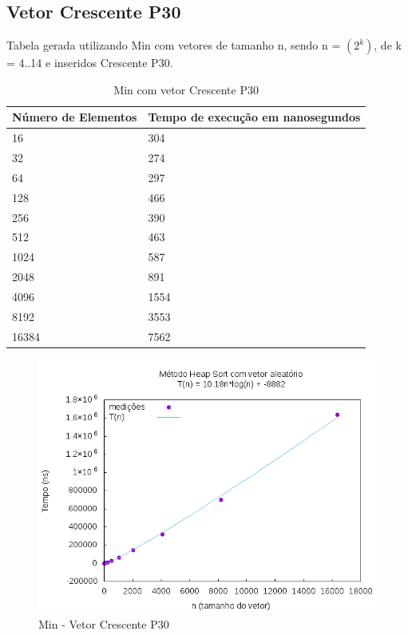 \documentclass[12pt,a4paper,twoside]{report}
\begin{document}
\subsection{Vetor Crescente P30}
Tabela gerada utilizando Min com vetores de tamanho n, sendo n = $(2^k)$, de k = 4..14 e inseridos Crescente P30.
\begin{table}[H]
\centering
\caption{Min com vetor Crescente P30}
\label{my-label}
\begin{tabular}{|l|l|}
\hline
\multicolumn{1}{|c|}{\textbf{Número de Elementos}} & \multicolumn{1}{c|}{\textbf{Tempo de execução em nanosegundos}} \\ \hline
16 & 304 \\ \hline
32 & 274 \\ \hline
64 & 297 \\ \hline
128 & 466 \\ \hline
256 & 390 \\ \hline
512 & 463 \\ \hline
1024 & 587 \\ \hline
2048 & 891 \\ \hline
4096 & 1554 \\ \hline
8192 & 3553 \\ \hline
16384 & 7562 \\ \hline

\end{tabular}
\end{table}

\begin{figure}[H]
    \centering
    \includegraphics[width=0.7\linewidth]{graficos/HeapSort/vIntAleatorio/vIntAleatorio.png}
  \caption{Min - Vetor Crescente P30}
\end{figure}
\end{document}
